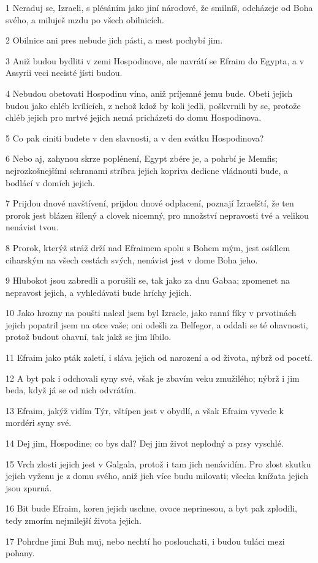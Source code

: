 \par 1 Neraduj se, Izraeli, s plésáním jako jiní národové, že smilníš, odcházeje od Boha svého, a miluješ mzdu po všech obilnicích.
\par 2 Obilnice ani pres nebude jich pásti, a mest pochybí jim.
\par 3 Aniž budou bydliti v zemi Hospodinove, ale navrátí se Efraim do Egypta, a v Assyrii veci necisté jísti budou.
\par 4 Nebudou obetovati Hospodinu vína, aniž príjemné jemu bude. Obeti jejich budou jako chléb kvílících, z nehož kdož by koli jedli, poškvrnili by se, protože chléb jejich pro mrtvé jejich nemá pricházeti do domu Hospodinova.
\par 5 Co pak ciniti budete v den slavnosti, a v den svátku Hospodinova?
\par 6 Nebo aj, zahynou skrze poplénení, Egypt zbére je, a pohrbí je Memfis; nejrozkošnejšími schranami stríbra jejich kopriva dedicne vládnouti bude, a bodlácí v domích jejich.
\par 7 Prijdou dnové navštívení, prijdou dnové odplacení, poznají Izraelští, že ten prorok jest blázen šílený a clovek nicemný, pro množství nepravosti tvé a velikou nenávist tvou.
\par 8 Prorok, kterýž stráž drží nad Efraimem spolu s Bohem mým, jest osídlem ciharským na všech cestách svých, nenávist jest v dome Boha jeho.
\par 9 Hlubokot jsou zabredli a porušili se, tak jako za dnu Gabaa; zpomenet na nepravost jejich, a vyhledávati bude hríchy jejich.
\par 10 Jako hrozny na poušti nalezl jsem byl Izraele, jako ranní fíky v prvotinách jejich popatril jsem na otce vaše; oni odešli za Belfegor, a oddali se té ohavnosti, protož budout ohavní, tak jakž se jim líbilo.
\par 11 Efraim jako pták zaletí, i sláva jejich od narození a od života, nýbrž od pocetí.
\par 12 A byt pak i odchovali syny své, však je zbavím veku zmužilého; nýbrž i jim beda, když já se od nich odvrátím.
\par 13 Efraim, jakýž vidím Týr, vštípen jest v obydlí, a však Efraim vyvede k mordéri syny své.
\par 14 Dej jim, Hospodine; co bys dal? Dej jim život neplodný a prsy vyschlé.
\par 15 Vrch zlosti jejich jest v Galgala, protož i tam jich nenávidím. Pro zlost skutku jejich vyženu je z domu svého, aniž jich více budu milovati; všecka knížata jejich jsou zpurná.
\par 16 Bit bude Efraim, koren jejich uschne, ovoce neprinesou, a byt pak zplodili, tedy zmorím nejmilejší života jejich.
\par 17 Pohrdne jimi Buh muj, nebo nechtí ho poslouchati, i budou tuláci mezi pohany.

